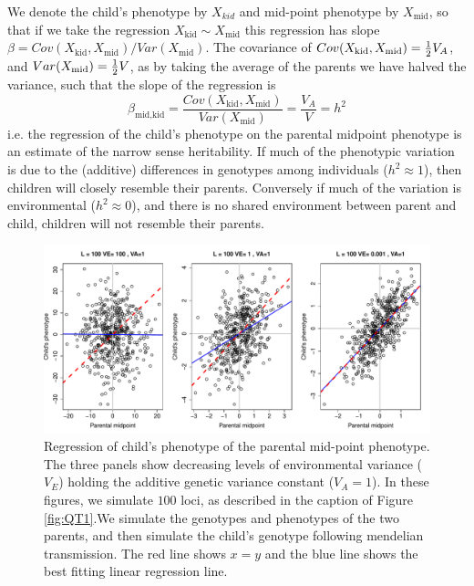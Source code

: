 We denote the child's phenotype by $X_{kid}$ and mid-point
phenotype by $X_{\textrm{mid}}$, so that if we take the regression $X_{\textrm{kid}} \sim X_{\textrm{mid}}$ this
regression has slope $\beta = Cov(X_{\textrm{kid}},X_{\textrm{mid}})/Var(X_{\textrm{mid}})$.
The covariance of $Cov(X_{\textrm{kid}},X_{\textrm{mid}})=\tfrac{1}{2}
V_A$, and $Var(X_{\textrm{mid}}) = \tfrac{1}{2} V$, as by taking the average of the
parents we have halved the variance, such that the slope of the
regression is
\begin{equation}
\beta_{\textrm{mid}, \textrm{kid}}=
\frac{Cov(X_{\textrm{kid}},X_{\textrm{mid}})}{Var(X_{\textrm{mid}})}=
\frac{V_A}{V} = h^2 \label{eqn:par_off_herit}
\end{equation}
i.e. the regression of the child's phenotype on the parental midpoint
phenotype is an estimate of the narrow sense
heritability. If much
of the phenotypic variation is due to the (additive) differences in
genotypes among individuals ($h^2 \approx 1$), then children will closely resemble their
parents. Conversely if much of the variation is environmental  ($h^2 \approx 0$), and
there is no shared environment between parent and child, children will
not resemble their parents.

\begin{figure}
\begin{center}
\includegraphics[width=\textwidth]{figures/QT2.pdf}
\end{center}
\caption{Regression of child's phenotype of the parental mid-point phenotype. The three panels show decreasing levels of environmental
  variance ($V_E$) holding the additive genetic variance constant ($V_A=1$). 
 In these figures, we simulate $100$ loci, as described in
 the caption of Figure \ref{fig:QT1}.We simulate the genotypes and
 phenotypes of the two parents, and then simulate the child's genotype
following mendelian transmission. The red line shows $x=y$ and the blue
line shows the best fitting linear regression
line. 
} \label{fig:midpar}
\end{figure}


